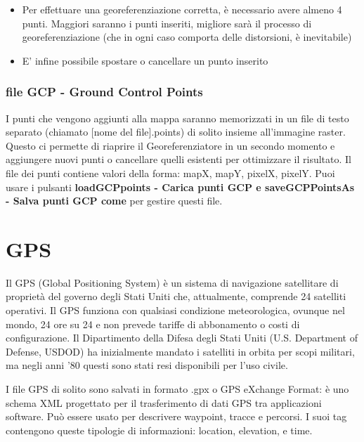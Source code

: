 \documentclass{beamer}
\begin{document}
{\begin{frame}
\begin{itemize}
        \item Per effettuare una georeferenziazione corretta, è necessario avere almeno 4 punti. Maggiori saranno i punti inseriti, migliore sarà il processo di georeferenziazione (che in ogni caso comporta delle distorsioni, è inevitabile)

        \item E' infine possibile spostare o cancellare un punto inserito
      
    \end{itemize}		
\end{frame} 

\begin{frame}
   \frametitle{file GCP - Ground Control Points}

    I punti che vengono aggiunti alla mappa saranno memorizzati in un file di testo separato (chiamato [nome del file].points) di solito insieme all’immagine raster. Questo ci permette di riaprire il Georeferenziatore in un secondo momento e aggiungere nuovi punti o cancellare quelli esistenti per ottimizzare il risultato. Il file dei punti contiene valori della forma: mapX, mapY, pixelX, pixelY. Puoi usare i pulsanti \textbf{loadGCPpoints - Carica punti GCP e saveGCPPointsAs - Salva punti GCP come } per gestire questi file.
    
\end{frame}

\section{GPS}

\begin{frame}

Il GPS (Global Positioning System) è un sistema di navigazione satellitare di proprietà del governo degli Stati Uniti che, attualmente, comprende 24 satelliti operativi. Il GPS funziona con qualsiasi condizione meteorologica, ovunque nel mondo, 24 ore su 24 e non prevede tariffe di abbonamento o costi di configurazione. Il Dipartimento della Difesa degli Stati Uniti (U.S. Department of Defense, USDOD) ha inizialmente mandato i satelliti in orbita per scopi militari, ma negli anni '80 questi sono stati resi disponibili per l'uso civile.

\end{frame}

\begin{frame}

I file GPS di solito sono salvati in formato .gpx o GPS eXchange Format: è uno schema XML progettato per il trasferimento di dati GPS tra applicazioni software. Può essere usato per descrivere waypoint, tracce e percorsi. I suoi tag contengono queste tipologie di informazioni: location, elevation, e time.


\end{frame}}
\end{document}
